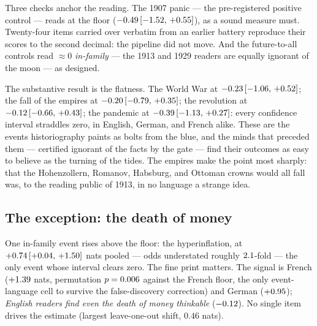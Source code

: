 \documentclass[11pt]{article}
\begin{document}
\begin{table}[t]\centering\small

\caption{\textbf{The panel, ranked by pooled $\Delta$ at the nearest pre-event reader.} An in-family anchor is
a Ranke model whose corpus contains the event; ``modern (bridged)'' rows are indicative only. Twelve items per
event per language; 95\% cluster-bootstrap intervals over translated item triplets. Per-language estimates in
Appendix~\ref{app:lang}.}
\label{tab:ranking}
\end{table}

Three checks anchor the reading. The 1907 panic --- the pre-registered positive control --- reads at the floor
($-0.49\,[-1.52,\,+0.55]$), as a sound measure must. Twenty-four items carried over verbatim from an earlier battery
reproduce their scores to the second decimal: the pipeline did not move. And the future-to-all controls read
$\approx 0$ \emph{in-family} --- the 1913 and 1929 readers are equally ignorant of the moon --- as designed.

The substantive result is the flatness. The World War at $-0.23\,[-1.06,\,+0.52]$; the fall of the empires at $-0.20\,[-0.79,\,+0.35]$;
the revolution at $-0.12\,[-0.66,\,+0.43]$; the pandemic at $-0.39\,[-1.13,\,+0.27]$: every confidence interval straddles zero, in
English, German, and French alike. These are the events historiography paints as bolts from the blue, and
the minds that preceded them --- certified ignorant of the facts by the gate --- find their outcomes as easy
to believe as the turning of the tides. The empires make the point most sharply: that the Hohenzollern,
Romanov, Habsburg, and Ottoman crowns would all fall was, to the reading public of 1913, in no language a
strange idea.

\subsection{The exception: the death of money}\label{sec:infl}

One in-family event rises above the floor: the hyperinflation, at $+0.74\,[+0.04,\,+1.50]$ nats pooled --- odds understated
roughly $2.1$-fold --- the only event whose interval clears zero. The fine print matters. The signal is
French ($+1.39$ nats, permutation $p=0.006$ against the French floor, the only event-language
cell to survive the false-discovery correction) and German ($+0.95$); \emph{English readers find even
the death of money thinkable} ($-0.12$). No single item drives the estimate (largest leave-one-out
shift, $0.46$ nats).
\end{document}
